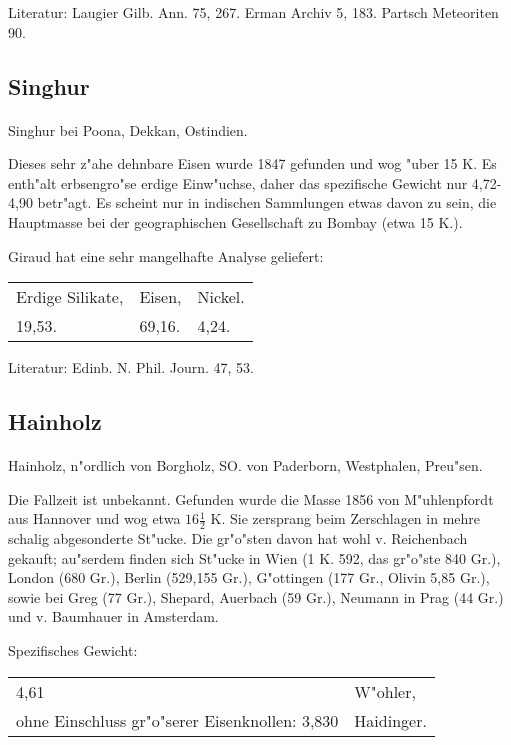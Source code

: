 \documentclass[a4paper, 11pt, oneside]{article}
\begin{document}
\footnotesize
Literatur: Laugier Gilb. Ann. 75, 267. Erman Archiv 5, 183. Partsch Meteoriten 90.

\subsection{Singhur}
\normalsize
\paragraph{}
Singhur bei Poona, Dekkan, Ostindien.

Dieses sehr z"ahe dehnbare Eisen wurde 1847 gefunden und wog "uber 15 K. Es enth"alt erbsengro"se erdige Einw"uchse, daher das spezifische Gewicht nur 4,72-4,90 betr"agt. Es scheint nur in indischen Sammlungen etwas davon zu sein, die Hauptmasse bei der geographischen Gesellschaft zu Bombay (etwa 15 K.).

Giraud hat eine sehr mangelhafte Analyse geliefert:
\begin{table}[H]
    \centering
    \begin{tabular}{l l l}
        Erdige Silikate, & Eisen, & Nickel. \\
        19,53. & 69,16. & 4,24. \\
    \end{tabular}
\end{table}

\footnotesize
Literatur: Edinb. N. Phil. Journ. 47, 53.

\subsection{Hainholz}
\normalsize
\paragraph{}
Hainholz, n"ordlich von Borgholz, SO. von Paderborn, Westphalen, Preu"sen.

Die Fallzeit ist unbekannt. Gefunden wurde die Masse 1856 von M"uhlenpfordt aus Hannover und wog etwa $16\frac{1}{2}$ K. Sie zersprang beim Zerschlagen in mehre schalig abgesonderte St"ucke. Die gr"o"sten davon hat wohl v. Reichenbach gekauft; au"serdem finden sich St"ucke in Wien (1 K. 592, das gr"o"ste 840 Gr.), London (680 Gr.), Berlin (529,155 Gr.), G"ottingen (177 Gr., Olivin 5,85 Gr.), sowie bei Greg (77 Gr.), Shepard, Auerbach (59 Gr.), Neumann in Prag (44 Gr.) und v. Baumhauer in Amsterdam.

Spezifisches Gewicht: 
\begin{table}[!ht]
    \centering
    \begin{tabular}{l l}
        4,61 & W"ohler,\\
        ohne Einschluss gr"o"serer Eisenknollen: 3,830 & Haidinger.
    \end{tabular}
\end{table}
\end{document}
